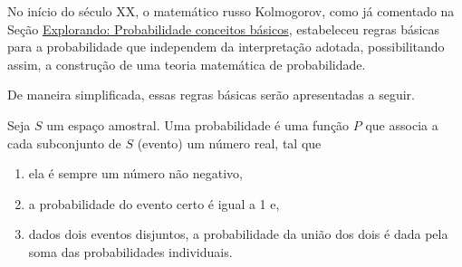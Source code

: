 
No início do século XX, o matemático russo Kolmogorov, como já comentado na Seção \hyperref[conceitosbasicos]{Explorando: Probabilidade \textendash{} conceitos básicos}, estabeleceu regras básicas para a probabilidade que independem da interpretação adotada, possibilitando assim, a construção de uma teoria matemática de probabilidade.

De maneira simplificada, essas regras básicas serão apresentadas a seguir.

Seja \(S\) um espaço amostral. Uma probabilidade é uma função \(P\) que associa a cada subconjunto de \(S\) (evento)  um número real, tal que
\begin{enumerate}
\item {} 
ela é sempre um número não negativo,

\item {} 
a probabilidade do evento certo é igual a 1 e,

\item {} 
dados dois eventos disjuntos, a probabilidade da união dos dois é dada pela soma das probabilidades individuais.

\end{enumerate}

